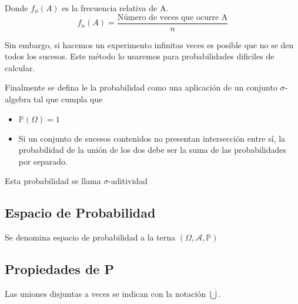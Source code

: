 \documentclass[11pt]{article}
\theoremstyle{plain}
\begin{document}
            Donde $f_{n}(A)$ es la frecuencia relativa de A.
            \begin{equation}
                f_{n}(A) = \frac{\textrm{Número de veces que ocurre A}}{n}
            \end{equation}

            Sin embargo, si hacemos un experimento infinitas veces es posible que no se den todos los sucesos. Este método lo usaremos para probabilidades dificiles de calcular.

            Finalmente se defina le la probabilidad como una aplicación de un conjunto $\sigma$-algebra tal que cumpla que 
            \begin{itemize}
                \item $\mathbb{P}(\varOmega) = 1$
                \item Si un conjunto de sucesos contenidos no presentan intersección entre sí, la probabilidad de la unión de los dos debe ser la suma de las probabilidades por separado.
            \end{itemize}
            Esta probabilidad se llama $\sigma$-aditividad
            \subsection{Espacio de Probabilidad} %
            \label{sub:espacio_de_probabilidad}
                Se denomina espacio de probabilidad a la terna $(\varOmega,\mathcal{A},\mathbb{P})$
            
            \subsection{Propiedades de P} %
            \label{sub:propiedades_de_p}
                Las uniones disjuntas a veces se indican con la notación $\dot{\bigcup}$.
\end{document}

